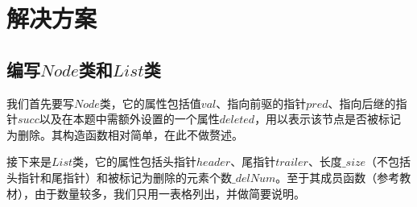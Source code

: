 \documentclass[UTF8]{ctexart}
\begin{document}
	
	\section{解决方案}
		\subsection{编写$Node$类和$List$类}\label{desigh_class}
			\indent 我们首先要写$Node$类，它的属性包括值$val$、指向前驱的指针$pred$、指向后继的指针$succ$以及在本题中需额外设置的一个属性$deleted$，用以表示该节点是否被标记为删除。其构造函数相对简单，在此不做赘述。
			
			\indent 接下来是$List$类，它的属性包括头指针$header$、尾指针$trailer$、长度$\_size$（不包括头指针和尾指针）和被标记为删除的元素个数$\_delNum$。至于其成员函数（参考教材\cite{data_structure}），由于数量较多，我们只用一表格列出，并做简要说明。
\end{document}
